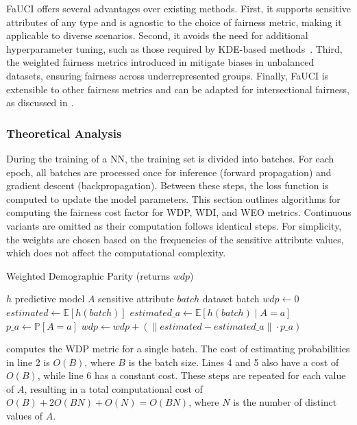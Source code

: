 %
\gls{FaUCI} offers several advantages over existing methods.
%
First, it supports sensitive attributes of any type and is agnostic to the choice of fairness metric, making it applicable to diverse scenarios.
%
Second, it avoids the need for additional hyperparameter tuning, such as those required by \gls{KDE}-based methods~\cite{DBLP:conf/nips/ChoHS20}.
%
Third, the weighted fairness metrics introduced in  mitigate biases in unbalanced datasets, ensuring fairness across underrepresented groups.
%
Finally, \gls{FaUCI} is extensible to other fairness metrics and can be adapted for intersectional fairness, as discussed in .



\subsubsection{Theoretical Analysis}
\label{subsubsec:theoretical}
%
During the training of a \gls{NN}, the training set is divided into batches.
%
For each epoch, all batches are processed once for inference (forward propagation) and gradient descent (backpropagation).
%
Between these steps, the loss function is computed to update the model parameters.
%
This section outlines algorithms for computing the fairness cost factor for \gls{WDP}, \gls{WDI}, and \gls{WEO} metrics.
%
Continuous variants are omitted as their computation follows identical steps.
%
For simplicity, the weights are chosen based on the frequencies of the sensitive attribute values, which does not affect the computational complexity.

\begin{algorithm}
    \caption{Weighted Demographic Parity (returns $wdp$)}
    \label{alg:wdp}
    \begin{algorithmic}[1]
        \REQUIRE $h$ \hfill predictive model
        \REQUIRE $A$ \hfill sensitive attribute
        \REQUIRE $batch$ \hfill dataset batch
        \STATE $wdp \leftarrow 0$
        \STATE $estimated \leftarrow \mathbb{E}[h(batch)]$
            \STATE $estimated\_a \leftarrow \mathbb{E}[h(batch) \mid A = a]$
            \STATE $p\_a \leftarrow \mathbb{P}[A = a]$
            \STATE $wdp \leftarrow wdp + \left( \| estimated - estimated\_a \| \cdot p\_a \right)$
        \ENDFOR
    \end{algorithmic}
\end{algorithm}

%
 computes the \gls{WDP} metric for a single batch.
%
The cost of estimating probabilities in line 2 is \(O(B)\), where \(B\) is the batch size.
%
Lines 4 and 5 also have a cost of \(O(B)\), while line 6 has a constant cost.
%
These steps are repeated for each value of \(A\), resulting in a total computational cost of \(O(B) + 2O(BN) + O(N) = O(BN)\), where \(N\) is the number of distinct values of \(A\).

